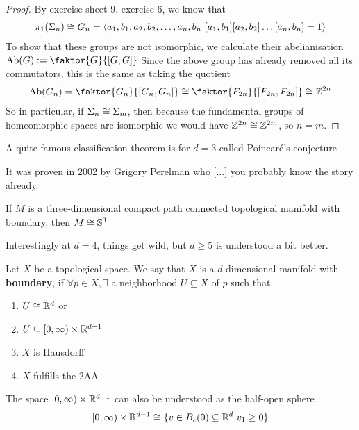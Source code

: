 \begin{proof}
By exercise sheet 9, exercise 6, we know that
\begin{align*}
  \pi_1(\Sigma_n) \cong G_n= \langle a_1,b_1,a_2,b_2, \ldots, a_n,b_n \big\vert[a_1,b_1][a_2,b_2]\dots[a_n,b_n] = 1\rangle 
\end{align*}
To show that these groups are not isomorphic, we calculate their abelianisation $\text{Ab}(G) := \faktor{G}{[G,G]}$
Since the above group has already removed all its commutators, this is the same as taking the quotient
\begin{align*}
  \text{Ab}(G_n) = \faktor{G_n}{[G_n,G_n]} \iso \faktor{F_{2n}}{[F_{2n},F_{2n}]} \iso \Z^{2n}
\end{align*}
So in particular, if $\Sigma_n \cong \Sigma_m$, then because the fundamental groups of homeomorphic spaces are isomorphic we would have $\mathbb{Z}^{2n} \cong \mathbb{Z}^{2m}$, so $n = m$.
\end{proof}


A quite famous classification theorem is for $d=3$ called Poincaré's conjecture

It was proven in 2002 by Grigory Perelman who [...] you probably know the story already.

\begin{thm}[Perelman]
If $M$ is a three-dimensional compact path connected topological manifold with boundary, then $M\cong \mathbb{S}^{3}$
\end{thm}

Interestingly at $d=4$, things get wild, but $d \geq 5$ is understood a bit better.


\begin{dfn}[]
Let $X$ be a topological space. We say that $X$ is a $d$-dimensional manifold with \textbf{boundary}, if
$\forall p \in X, \exists$ a neighborhood $U \subseteq X$ of $p$ such that
\begin{enumerate}
  \item $U \cong \mathbb{R}^{d}$ or
  \item $U \subseteq [0,\infty)  \times \mathbb{R}^{d-1}$ 
  \item $X$ is Hausdorff
  \item $X$ fulfills the 2AA
\end{enumerate}
\end{dfn}
The space $[0,\infty) \times \mathbb{R}^{d-1}$ can also be understood as the half-open sphere
\begin{align*}
  [0,\infty) \times \mathbb{R}^{d-1} \cong \{v \in B_{\epsilon}(0) \subseteq \mathbb{R}^{d} \big\vert v_1 \geq 0\}
\end{align*}

